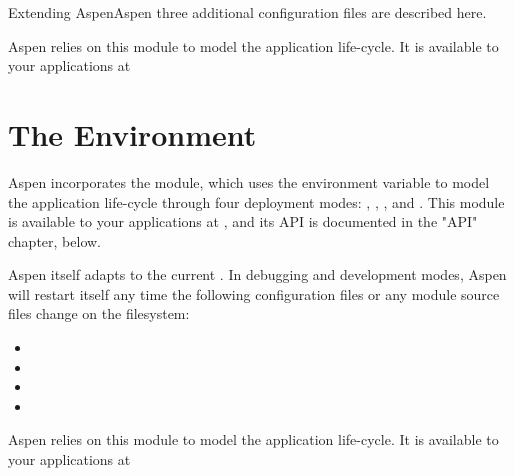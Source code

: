 \begin{seealso}

{Extending Aspen}{Aspen three additional configuration files are described
here.}

{}{Aspen relies on this module to model the application life-cycle.
It is available to your applications at }

\end{seealso}


\section{The Environment \label{environment}}

Aspen incorporates the  module, which uses the 
environment variable to model the application life-cycle through four deployment
modes: , , , and
. This module is available to your applications at
, and its API is documented in the "API" chapter, below.

Aspen itself adapts to the current . In debugging and
development modes, Aspen will restart itself any time the following
configuration files or any module source files change on the filesystem:

\begin{itemize}
\item{}
\item{}
\item{}
\item{}
\end{itemize}


\begin{seealso}

{}{Aspen relies on this module to model the application life-cycle.
It is available to your applications at }

\end{seealso}
